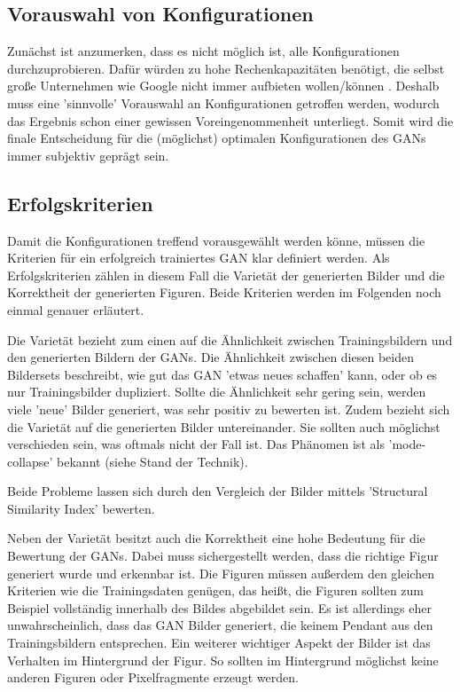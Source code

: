 \subsection{Vorauswahl von Konfigurationen}
Zunächst ist anzumerken, dass es nicht möglich ist, alle Konfigurationen durchzuprobieren.
Dafür würden zu hohe Rechenkapazitäten benötigt, die selbst große Unternehmen wie Google nicht immer aufbieten wollen/können \cite{are-gans-created-equally}.
Deshalb muss eine 'sinnvolle' Vorauswahl an Konfigurationen getroffen werden, wodurch das Ergebnis schon einer gewissen Voreingenommenheit unterliegt.
Somit wird die finale Entscheidung für die (möglichst) optimalen Konfigurationen des GANs immer subjektiv geprägt sein.

\subsection{Erfolgskriterien}
Damit die Konfigurationen treffend vorausgewählt werden könne, müssen die Kriterien für ein erfolgreich trainiertes GAN klar definiert werden.
Als Erfolgskriterien zählen in diesem Fall die Varietät der generierten Bilder und die Korrektheit der generierten Figuren.
Beide Kriterien werden im Folgenden noch einmal genauer erläutert.

Die Varietät bezieht zum einen auf die Ähnlichkeit zwischen Trainingsbildern und den generierten Bildern der GANs.
Die Ähnlichkeit zwischen diesen beiden Bildersets beschreibt, wie gut das GAN 'etwas neues schaffen' kann, oder ob es nur Trainingsbilder dupliziert.
Sollte die Ähnlichkeit sehr gering sein, werden viele 'neue' Bilder generiert, was sehr positiv zu bewerten ist.
Zudem bezieht sich die Varietät auf die generierten Bilder untereinander.
Sie sollten auch möglichst verschieden sein, was oftmals nicht der Fall ist.
Das Phänomen ist als 'mode-collapse' bekannt (siehe Stand der Technik). %

Beide Probleme lassen sich durch den Vergleich der Bilder mittels 'Structural Similarity Index' \cite{structural-similarity-index} bewerten.

Neben der Varietät besitzt auch die Korrektheit eine hohe Bedeutung für die Bewertung der GANs.
Dabei muss sichergestellt werden, dass die richtige Figur generiert wurde und erkennbar ist.
Die Figuren müssen außerdem den gleichen Kriterien wie die Trainingsdaten genügen, das heißt, die Figuren sollten zum Beispiel vollständig innerhalb des Bildes abgebildet sein.
Es ist allerdings eher unwahrscheinlich, dass das GAN Bilder generiert, die keinem Pendant aus den Trainingsbildern entsprechen.
Ein weiterer wichtiger Aspekt der Bilder ist das Verhalten im Hintergrund der Figur.
So sollten im Hintergrund möglichst keine anderen Figuren oder Pixelfragmente erzeugt werden.

